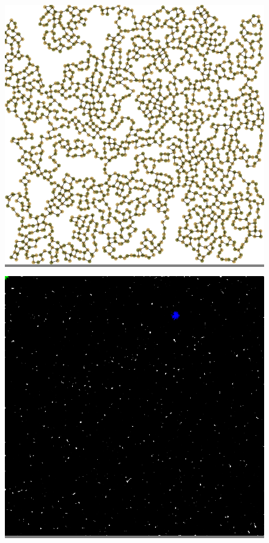 \documentclass{article}
\begin{document}
\begin{figure}
\begin{minipage}{0.3\textwidth}
    \end{minipage}
    \hspace{\fill}
    \begin{minipage}{0.3\textwidth}
    \colorbox{gray}{\includegraphics[width=\linewidth]{./images/square_2_bb_1.png}}
    \end{minipage}
    \vskip 0.1in
    \begin{minipage}{0.3\textwidth}
    \colorbox{gray}{\includegraphics[width=\linewidth]{./images/square_3.png}}

\end{minipage}
\end{figure}
\end{document}
